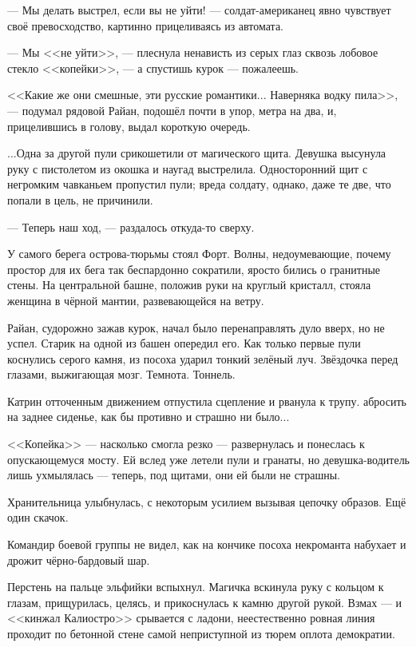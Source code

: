 

--- Мы делать выстрел, если вы не уйти! --- солдат-американец явно чувствует своё превосходство, картинно прицеливаясь из автомата.

--- Мы <<не уйти>>, --- плеснула ненависть из серых глаз сквозь лобовое стекло <<копейки>>,
--- а спустишь курок --- пожалеешь.

<<Какие же они смешные, эти русские романтики... Наверняка водку пила>>, ---
подумал рядовой Райан, подошёл почти в упор, метра на два, и, прицелившись в голову, выдал короткую очередь.

...Одна за другой пули срикошетили от магического щита. Девушка высунула руку с пистолетом из окошка и наугад выстрелила.
Односторонний щит с негромким чавканьем пропустил пули; вреда солдату, однако, даже те две, что попали в цель, не причинили.

\emptypar

--- Теперь наш ход, --- раздалось откуда-то сверху.

У самого берега острова-тюрьмы стоял Форт.
Волны, недоумевающие, почему простор для их бега так беспардонно сократили, яросто бились о гранитные стены.
На центральной башне, положив руки на круглый кристалл, стояла женщина в чёрной мантии, развевающейся на ветру.

Райан, судорожно зажав курок, начал было перенаправлять дуло вверх, но не успел. Старик на одной из башен опередил его.
Как только первые пули коснулись серого камня, из посоха ударил тонкий зелёный луч.
Звёздочка перед глазами, выжигающая мозг. Темнота. Тоннель.

Катрин отточенным движением отпустила сцепление и рванула к трупу. 
абросить на заднее сиденье, как бы противно и страшно ни было...

<<Копейка>> --- насколько смогла резко --- развернулась и понеслась к опускающемуся мосту. Ей вслед уже летели пули и гранаты, но девушка-водитель лишь ухмылялась --- теперь, под щитами, они ей были не страшны.

Хранительница улыбнулась, с некоторым усилием вызывая цепочку образов. Ещё один скачок.

Командир боевой группы не видел, как на кончике посоха некроманта набухает и дрожит чёрно-бардовый шар.

Перстень на пальце эльфийки вспыхнул. Магичка вскинула руку с кольцом к глазам, прищурилась, целясь,
и прикоснулась к камню другой рукой.
Взмах --- и <<кинжал Калиостро>> срывается с ладони,
неестественно ровная линия проходит по бетонной стене самой неприступной из тюрем оплота демократии.

